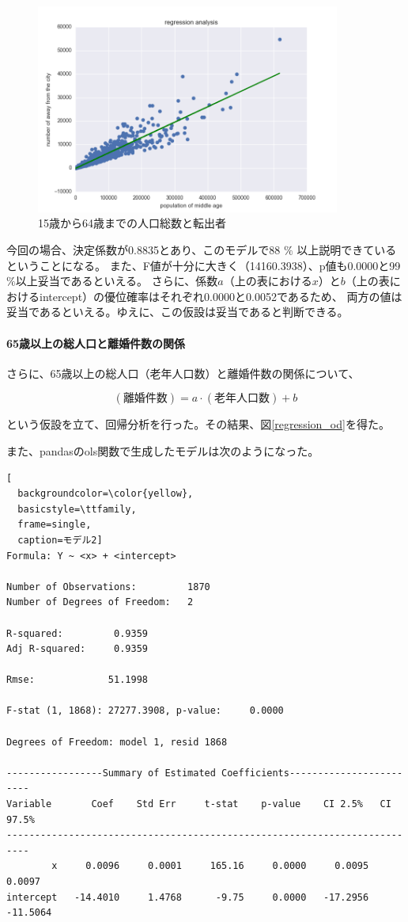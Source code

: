 \documentclass[a4paper,xelatex,ja=standard,jafont=hiragino-pron, 10pt]{bxjsarticle}
\begin{document}
\begin{figure}[ht]
  \centering
  \includegraphics[clip, width=10.0cm]{../data/picture/regression_ma.png}
  \caption{15歳から64歳までの人口総数と転出者}
  \label{reg_ma}
\end{figure}

今回の場合、決定係数が0.8835とあり、このモデルで88 $\%$ 以上説明できているということになる。
また、F値が十分に大きく（14160.3938）、p値も0.0000と99$\%$以上妥当であるといえる。
さらに、係数$a$（上の表における$x$）と$b$（上の表におけるintercept）の優位確率はそれぞれ0.0000と0.0052であるため、
両方の値は妥当であるといえる。ゆえに、この仮設は妥当であると判断できる。

\paragraph{65歳以上の総人口と離婚件数の関係}

さらに、65歳以上の総人口（老年人口数）と離婚件数の関係について、

\begin{equation}
  (\mbox{離婚件数}) = a \cdot (\mbox{老年人口数}) + b
\end{equation}

という仮設を立て、回帰分析を行った。その結果、図\ref{regression_od}を得た。

また、pandasのols関数で生成したモデルは次のようになった。

\begin{lstlisting}[
  backgroundcolor=\color{yellow},
  basicstyle=\ttfamily,
  frame=single,
  caption=モデル2]
Formula: Y ~ <x> + <intercept>

Number of Observations:         1870
Number of Degrees of Freedom:   2

R-squared:         0.9359
Adj R-squared:     0.9359

Rmse:             51.1998

F-stat (1, 1868): 27277.3908, p-value:     0.0000

Degrees of Freedom: model 1, resid 1868

-----------------Summary of Estimated Coefficients------------------------
Variable       Coef    Std Err     t-stat    p-value    CI 2.5%   CI 97.5%
--------------------------------------------------------------------------
        x     0.0096     0.0001     165.16     0.0000     0.0095     0.0097
intercept   -14.4010     1.4768      -9.75     0.0000   -17.2956   -11.5064
\end{lstlisting}
\end{document}
